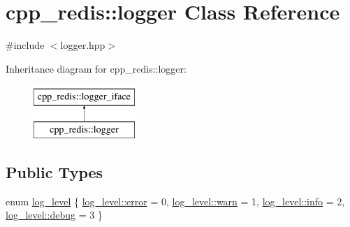 \hypertarget{classcpp__redis_1_1logger}{}\section{cpp\+\_\+redis\+:\+:logger Class Reference}
\label{classcpp__redis_1_1logger}


{\ttfamily \#include $<$logger.\+hpp$>$}

Inheritance diagram for cpp\+\_\+redis\+:\+:logger\+:\begin{figure}[H]
\begin{center}
\leavevmode
\includegraphics[height=2.000000cm]{classcpp__redis_1_1logger}
\end{center}
\end{figure}
\subsection*{Public Types}
\begin{DoxyCompactItemize}
\item 
enum \hyperlink{classcpp__redis_1_1logger_a9493594d547e7abe71b8690be1946c7a}{log\+\_\+level} \{ \hyperlink{classcpp__redis_1_1logger_a9493594d547e7abe71b8690be1946c7aacb5e100e5a9a3e7f6d1fd97512215282}{log\+\_\+level\+::error} = 0, 
\hyperlink{classcpp__redis_1_1logger_a9493594d547e7abe71b8690be1946c7aa1ea4c3ab05ee0c6d4de30740443769cb}{log\+\_\+level\+::warn} = 1, 
\hyperlink{classcpp__redis_1_1logger_a9493594d547e7abe71b8690be1946c7aacaf9b6b99962bf5c2264824231d7a40c}{log\+\_\+level\+::info} = 2, 
\hyperlink{classcpp__redis_1_1logger_a9493594d547e7abe71b8690be1946c7aaad42f6697b035b7580e4fef93be20b4d}{log\+\_\+level\+::debug} = 3
 \}
\end{DoxyCompactItemize}
